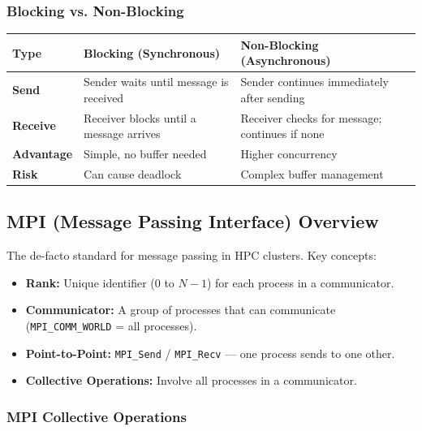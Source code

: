 \documentclass[11pt,a4paper]{article}
\begin{document}
\subsubsection{Blocking vs. Non-Blocking}
\begin{longtable}{@{}p{3.5cm}p{5.2cm}p{5.2cm}@{}}
\toprule
\rowcolor{primary!15}
\textbf{Type} & \textbf{Blocking (Synchronous)} & \textbf{Non-Blocking (Asynchronous)} \\
\midrule
\endhead
\textbf{Send} & Sender waits until message is received & Sender continues immediately after sending \\
\textbf{Receive} & Receiver blocks until a message arrives & Receiver checks for message; continues if none \\
\textbf{Advantage} & Simple, no buffer needed & Higher concurrency \\
\textbf{Risk} & Can cause deadlock & Complex buffer management \\
\bottomrule
\end{longtable}

\subsection{MPI (Message Passing Interface) Overview}
\begin{conceptbox}
The de-facto standard for message passing in HPC clusters. Key concepts:
\begin{itemize}[leftmargin=*, itemsep=3pt]
  \item \textbf{Rank:} Unique identifier (0 to $N{-}1$) for each process in a communicator.
  \item \textbf{Communicator:} A group of processes that can communicate (\texttt{MPI\_COMM\_WORLD} = all processes).
  \item \textbf{Point-to-Point:} \texttt{MPI\_Send} / \texttt{MPI\_Recv} --- one process sends to one other.
  \item \textbf{Collective Operations:} Involve all processes in a communicator.
\end{itemize}
\end{conceptbox}

\subsubsection{MPI Collective Operations}
\end{document}
